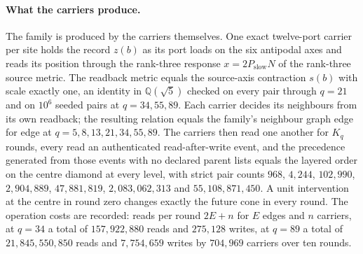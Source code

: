\paragraph{What the carriers produce.}
The family is produced by the carriers themselves. One exact twelve-port
carrier per site holds the record $z(b)$ as its port loads on the six
antipodal axes and reads its position through the rank-three response
$x=2P_{\mathrm{slow}}N$ of the rank-three source metric. The readback metric
equals the source-axis contraction $s(b)$ with scale exactly one, an identity
in $\mathbb Q(\sqrt5)$ checked on every pair through $q=21$ and on $10^6$
seeded pairs at $q=34,55,89$. Each carrier decides its neighbours from its
own readback; the resulting relation equals the family's neighbour graph
edge for edge at $q=5,8,13,21,34,55,89$. The carriers then read one another
for $K_q$ rounds, every read an authenticated read-after-write event, and the
precedence generated from those events with no declared parent lists equals
the layered order on the centre diamond at every level, with strict pair
counts $968$, $4{,}244$, $102{,}990$, $2{,}904{,}889$, $47{,}881{,}819$,
$2{,}083{,}062{,}313$ and $55{,}108{,}871{,}450$. A unit intervention at the
centre in round zero changes exactly the future cone in every round. The
operation costs are recorded: reads per round $2E+n$ for $E$ edges and $n$
carriers, at $q=34$ a total of $157{,}922{,}880$ reads and $275{,}128$
writes, at $q=89$ a total of $21{,}845{,}550{,}850$ reads and $7{,}754{,}659$
writes by $704{,}969$ carriers over ten rounds.

